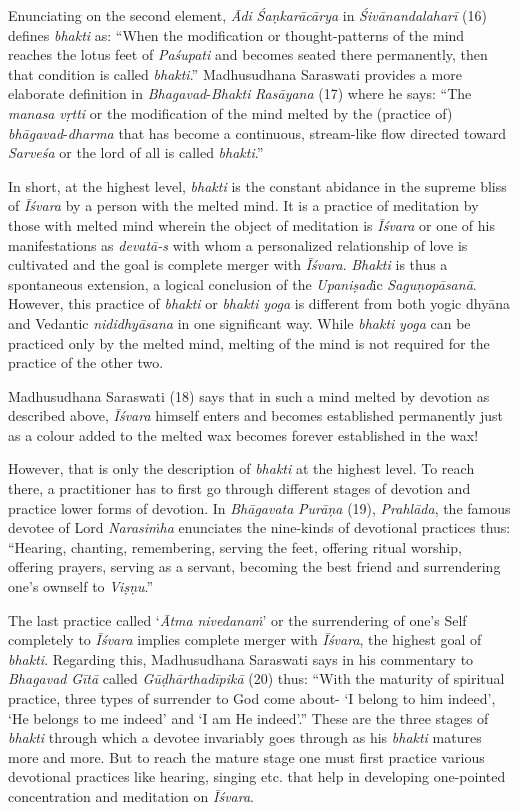 Enunciating on the second element, \emph{Ādi} \emph{Śaṇkarācārya} in \emph{Śivānandalaharī} (16) defines \emph{bhakti} as: ``When the modification or thought-patterns of the mind reaches the lotus feet of \emph{Paśupati} and becomes seated there permanently, then that condition is called \emph{bhakti}.'' Madhusudhana Saraswati provides a more elaborate definition in \emph{Bhagavad}-\emph{Bhakti} \emph{Rasāyana} (17) where he says: ``The \emph{manasa} \emph{vṛtti} or the modification of the mind melted by the (practice of) \emph{bhāgavad}-\emph{dharma} that has become a continuous, stream-like flow directed toward \emph{Sarveśa} or the lord of all is called \emph{bhakti}.''

In short, at the highest level, \emph{bhakti} is the constant abidance in the supreme bliss of \emph{Īśvara} by a person with the melted mind. It is a practice of meditation by those with melted mind wherein the object of meditation is \emph{Īśvara} or one of his manifestations as \emph{devatā-s} with whom a personalized relationship of love is cultivated and the goal is complete merger with \emph{Īśvara}. \emph{Bhakti} is thus a spontaneous extension, a logical conclusion of the \emph{Upaniṣad}ic \emph{Saguṇopāsanā}. However, this practice of \emph{bhakti} or \emph{bhakti} \emph{yoga} is different from both yogic dhyāna and Vedantic \emph{nididhyāsana} in one significant way. While \emph{bhakti} \emph{yoga} can be practiced only by the melted mind, melting of the mind is not required for the practice of the other two.

Madhusudhana Saraswati (18) says that in such a mind melted by devotion as described above, \emph{Īśvara} himself enters and becomes established permanently just as a colour added to the melted wax becomes forever established in the wax!

However, that is only the description of \emph{bhakti} at the highest level. To reach there, a practitioner has to first go through different stages of devotion and practice lower forms of devotion. In \emph{Bhāgavata} \emph{Purāṇa} (19), \emph{Prahlāda}, the famous devotee of Lord \emph{Narasiṁha} enunciates the nine-kinds of devotional practices thus: ``Hearing, chanting, remembering, serving the feet, offering ritual worship, offering prayers, serving as a servant, becoming the best friend and surrendering one's ownself to \emph{Viṣṇu}.''

The last practice called `\emph{Ātma} \emph{nivedanaṁ}' or the surrendering of one's Self completely to \emph{Īśvara} implies complete merger with \emph{Īśvara}, the highest goal of \emph{bhakti}. Regarding this, Madhusudhana Saraswati says in his commentary to \emph{Bhagavad} \emph{Gītā} called \emph{Gūḍhārthadīpikā} (20) thus: ``With the maturity of spiritual practice, three types of surrender to God come about- `I belong to him indeed', `He belongs to me indeed' and `I am He indeed'.'' These are the three stages of \emph{bhakti} through which a devotee invariably goes through as his \emph{bhakti} matures more and more. But to reach the mature stage one must first practice various devotional practices like hearing, singing etc. that help in developing one-pointed concentration and meditation on \emph{Īśvara}.


